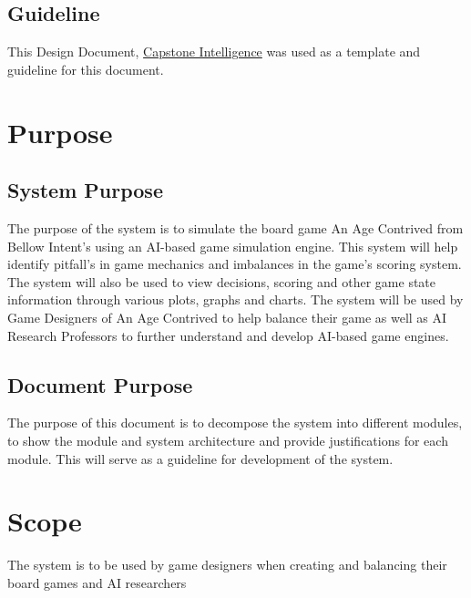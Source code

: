 \documentclass[12pt, titlepage]{article}
\begin{document}
\subsection{Guideline}
This Design Document, \href{https://gitlab.cas.mcmaster.ca/courses/capstone/-/blob/main/SamplesOfStudentWork/Design/Capstone%20Intelligence%20-%20System%20Design.pdf}{Capstone Intelligence} was used as a template and guideline for this document.
\newpage

\tableofcontents

\listoftables

\listoffigures

\newpage


\section{Purpose}
\subsection{System Purpose} 
The purpose of the system is to simulate the board game An Age Contrived from Bellow Intent's using an AI-based game simulation engine. This system will help identify pitfall's in game mechanics and imbalances in the game's scoring system. The system will also be used to view decisions, scoring and other game state information through various plots, graphs and charts.
The system will be used by Game Designers of An Age Contrived to help balance their game as well as AI Research Professors to further understand and develop AI-based game engines.
\subsection{Document Purpose}
The purpose of this document is to decompose the system into different modules, to show the module and system architecture and provide justifications for each module. This will serve as a guideline for development of the system.

\section{Scope}
The system is to be used by game designers when creating and balancing their board games and AI researchers 
\end{document}
